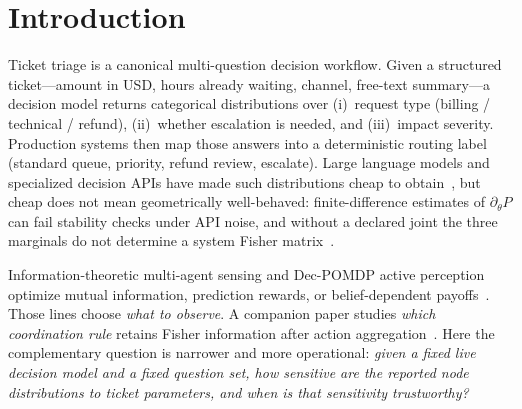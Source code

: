 \documentclass[11pt,a4paper]{article}
\begin{document}
\section{Introduction}

Ticket triage is a canonical multi-question decision workflow. Given a
structured ticket---amount in USD, hours already waiting, channel, free-text
summary---a decision model returns categorical distributions over (i)~request
type (billing / technical / refund), (ii)~whether escalation is needed, and
(iii)~impact severity. Production systems then map those answers into a
deterministic routing label (standard queue, priority, refund review,
escalate). Large language models and specialized decision APIs have made such
distributions cheap to obtain~\citep{yao2023react,park2023generative,typesafe2026},
but cheap does not mean geometrically well-behaved: finite-difference
estimates of $\partial_\theta P$ can fail stability checks under API noise,
and without a declared joint the three marginals do not determine a system
Fisher matrix~\citep{jevometry2026}.

Information-theoretic multi-agent sensing and Dec-POMDP active perception
optimize mutual information, prediction rewards, or belief-dependent
payoffs~\citep{lauri2020prediction,lauri2020decpomdp,oliehoek2016decpomdp,shi2026imas2,molloy2023smoother,corah2021scalable}.
Those lines choose \emph{what to observe}. A companion paper studies
\emph{which coordination rule} retains Fisher information after action
aggregation~\citep{li2026coordfisher}. Here the complementary question is
narrower and more operational: \emph{given a fixed live decision model and a
fixed question set, how sensitive are the reported node distributions to
ticket parameters, and when is that sensitivity trustworthy?}
\end{document}
